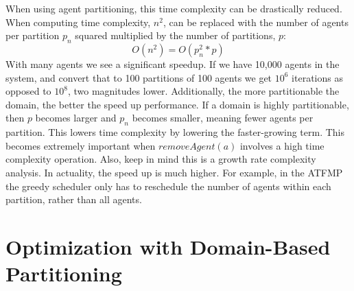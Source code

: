 \documentclass[smallcondensed]{svjour3}
\begin{document}
When using agent partitioning, this time complexity can be drastically reduced. When computing time complexity, $n^2$, can be replaced with the number of agents per partition $p_n$ squared multiplied by the number of partitions, $p$:
%
\begin{equation}
O(n^2) = O(p_n^2 * p)
\end{equation}
%
With many agents we see a significant speedup. If we have 10,000 agents in the system, and convert that to 100 partitions of 100 agents we get $10^6$ iterations as opposed to $10^8$, two magnitudes lower. Additionally, the more partitionable the domain, the better the speed up performance. If a domain is highly partitionable, then $p$ becomes larger and $p_n$ becomes smaller, meaning fewer agents per partition. This lowers time complexity by lowering the faster-growing term. This becomes extremely important when $removeAgent(a)$ involves a high time complexity operation. Also, keep in mind this is a growth rate complexity analysis. In actuality, the speed up is much higher. For example, in the ATFMP the greedy scheduler only has to reschedule the number of agents within each partition, rather than all agents.


\section{Optimization with Domain-Based Partitioning}
\label{sec:Domain-Based}
\end{document}
